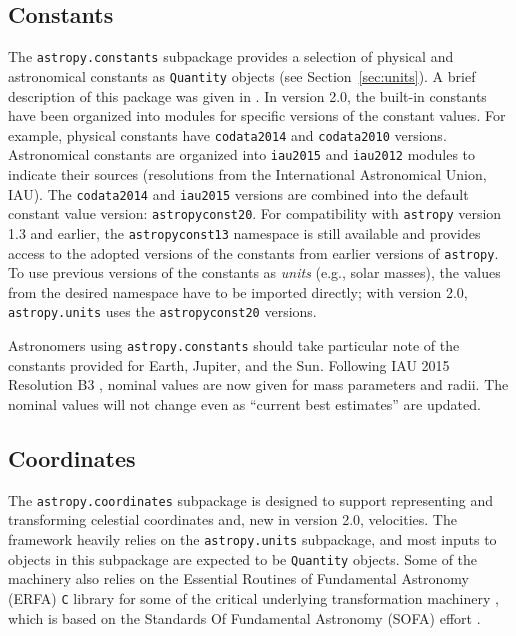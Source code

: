 \documentclass[modern]{aastex61}
\newcommand{\package}[1]{\texttt{#1}\xspace}
\newcommand{\astropypkg}{\package{astropy}}
\newcommand{\sectionname}{Section\xspace}
\newcommand{\inlinecomment}[2]{\todo[inline]{#1: #2}\xspace}
\begin{document}
\subsection{Constants}

The \texttt{astropy.constants} subpackage provides a selection of physical and
astronomical constants as \texttt{Quantity} objects (see
\sectionname~\ref{sec:units}).
A brief description of this package was given in \citep{astropy}.
In version 2.0, the built-in constants have been organized into modules for
specific versions of the constant values.
For example, physical constants have \texttt{codata2014} \citep{codata2014} and
\texttt{codata2010} versions.
Astronomical constants are organized into \texttt{iau2015} and \texttt{iau2012}
modules to indicate their sources (resolutions from the International
Astronomical Union, IAU).
The \texttt{codata2014} and \texttt{iau2015} versions are combined into the
default constant value version: \texttt{astropyconst20}.
For compatibility with \astropypkg version 1.3 and earlier, the \texttt{astropyconst13}
namespace \inlinecomment{Tom R}{jargon alert: 'namespace'} is still available and provides access to the adopted versions of the
constants from earlier versions of \astropypkg.
To use previous versions of the constants as \emph{units} (e.g., solar masses),
the values from the desired namespace have to be imported directly; with version
2.0, \texttt{astropy.units} uses the \texttt{astropyconst20} versions.

Astronomers using \texttt{astropy.constants} should take particular note of the
constants provided for Earth, Jupiter, and the Sun.
Following IAU 2015 Resolution B3 \citep{iau2015b3}, nominal values are now given
for mass parameters and radii.
The nominal values will not change even as ``current best estimates'' are
updated.

\subsection{Coordinates}
\label{sec:coordinates}
The \package{astropy.coordinates} subpackage is designed to support representing
and transforming celestial coordinates and, new in version 2.0, velocities.
The framework heavily relies on the \package{astropy.units} subpackage, and most
inputs to objects in this subpackage are expected to be \texttt{Quantity}
objects.
Some of the machinery also relies on the Essential Routines of Fundamental
Astronomy (ERFA) \texttt{C} library for some of the critical underlying
transformation machinery \citep{erfa}, which is based on the Standards Of
Fundamental Astronomy (SOFA) effort \citep{sofa}.
\end{document}
